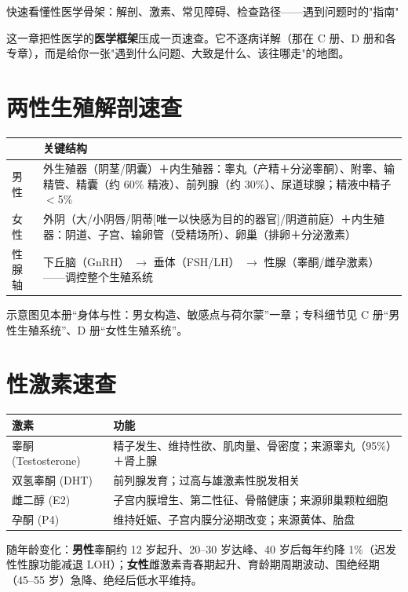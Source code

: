 \documentclass[12pt,UTF8,openany]{ctexbook}
\begin{document}
\begin{center}
\myhei\large 快速看懂性医学骨架：解剖、激素、常见障碍、检查路径——遇到问题时的"指南"
\end{center}

这一章把性医学的\textbf{医学框架}压成一页速查。它不逐病详解（那在 C 册、D 册和各专章），而是给你一张"遇到什么问题、大致是什么、该往哪走"的地图。

\section{两性生殖解剖速查}

\begin{tabularx}{\textwidth}{p{2.2cm}X}
\toprule
& 关键结构 \\
\midrule
男性 & 外生殖器（阴茎/阴囊）＋内生殖器：睾丸（产精＋分泌睾酮）、附睾、输精管、精囊（约 60\% 精液）、前列腺（约 30\%）、尿道球腺；精液中精子 $<$5\% \\
女性 & 外阴（大/小阴唇/阴蒂[唯一以快感为目的的器官]/阴道前庭）＋内生殖器：阴道、子宫、输卵管（受精场所）、卵巢（排卵＋分泌激素） \\
性腺轴 & 下丘脑（GnRH） $\to$ 垂体（FSH/LH） $\to$ 性腺（睾酮/雌孕激素）——调控整个生殖系统 \\
\bottomrule
\end{tabularx}

\noindent 示意图见本册“身体与性：男女构造、敏感点与荷尔蒙”一章；专科细节见 C 册“男性生殖系统”、D 册“女性生殖系统”。

\section{性激素速查}

\begin{tabularx}{\textwidth}{lX}
\toprule
激素 & 功能 \\
\midrule
睾酮 (Testosterone) & 精子发生、维持性欲、肌肉量、骨密度；来源睾丸（95\%）＋肾上腺 \\
双氢睾酮 (DHT) & 前列腺发育；过高与雄激素性脱发相关 \\
雌二醇 (E2) & 子宫内膜增生、第二性征、骨骼健康；来源卵巢颗粒细胞 \\
孕酮 (P4) & 维持妊娠、子宫内膜分泌期改变；来源黄体、胎盘 \\
\bottomrule
\end{tabularx}

\noindent 随年龄变化：\textbf{男性}睾酮约 12 岁起升、20--30 岁达峰、40 岁后每年约降 1\%（迟发性性腺功能减退 LOH）；\textbf{女性}雌激素青春期起升、育龄期周期波动、围绝经期（45--55 岁）急降、绝经后低水平维持。
\end{document}
